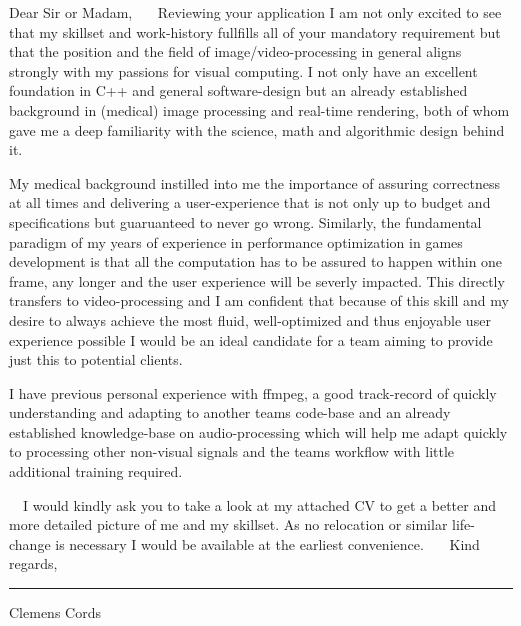 \documentclass[11pt]{article}
\newcommand{\muted}{\color{muted_grey}}
\newcommand{\emptyline}{\,\newline}
\begin{document}
\begin{flushleft}
Dear Sir or Madam,
\emptyline
\emptyline
\emptyline
Reviewing your application I am not only excited to see that my skillset and work-history fullfills all of your mandatory requirement but that the position and the field of image/video-processing in general aligns strongly with my passions for visual computing. I not only have an excellent foundation in C++ and general software-design but an already established background in (medical) image processing and real-time rendering, both of whom gave me a deep familiarity with the science, math and algorithmic design behind it.

My medical background instilled into me the importance of assuring correctness at all times and delivering a user-experience that is not only up to budget and specifications but guaruanteed to never go wrong. Similarly, the fundamental paradigm of my years of experience in performance optimization in games development is that all the computation has to be assured to happen within one frame, any longer and the user experience will be severly impacted. This directly transfers to video-processing and I am confident that because of this skill and my desire to always achieve the most fluid, well-optimized and thus enjoyable user experience possible I would be an ideal candidate for a team aiming to provide just this to potential clients.

I have previous personal experience with ffmpeg, a good track-record of quickly understanding and adapting to another teams code-base and an already established knowledge-base on audio-processing which will help me adapt quickly to processing other non-visual signals and the teams workflow with little additional training required.

\emptyline
\emptyline
I would kindly ask you to take a look at my attached CV to get a better and more detailed picture of me and my skillset.
As no relocation or similar life-change is necessary I would be available at the earliest convenience.
\emptyline
\emptyline
\emptyline
Kind regards,\newline
\emptyline
\emptyline
\emptyline
\emptyline

\rule[0pt]{30ex}{0.5pt}\newline
{\muted Clemens Cords}
\end{flushleft}
\end{document}
